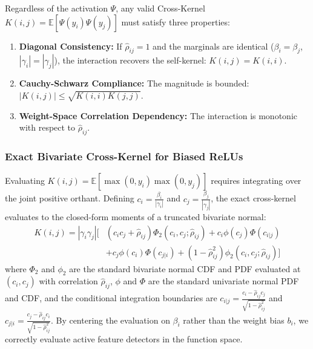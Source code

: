 \documentclass[11pt, a4paper, copyright, gdm]{google}
\newcommand{\abs}[1]{\left\lvert#1\right\rvert}
\newcommand{\E}{\mathbb{E}}
\newcommand{\normPDF}{\phi}
\newcommand{\normCDF}{\Phi}
\theoremstyle{definition}
\begin{document}
Regardless of the activation $\Psi$, any valid Cross-Kernel $K(i, j) = \E[\Psi(y_i)\Psi(y_j)]$ must satisfy three properties:
\begin{enumerate}
\item \textbf{Diagonal Consistency:} If $\hat{\rho}_{ij}=1$ and the marginals are identical ($\beta_i=\beta_j$, $|\gamma_i|=|\gamma_j|$), the interaction recovers the self-kernel: $K(i, j) = K(i, i)$.
\item \textbf{Cauchy-Schwarz Compliance:} The magnitude is bounded: $\abs{K(i, j)} \leq \sqrt{K(i, i) K(j, j)}$.
\item \textbf{Weight-Space Correlation Dependency:} The interaction is monotonic with respect to $\hat{\rho}_{ij}$.
\end{enumerate}

\subsubsection{Exact Bivariate Cross-Kernel for Biased ReLUs}
\label{sec:exact_bivar}
Evaluating $K(i, j) = \E[\max(0, y_i) \max(0, y_j)]$ requires integrating over the joint positive orthant. Defining $c_i = \frac{\beta_i}{|\gamma_i|}$ and $c_j = \frac{\beta_j}{|\gamma_j|}$, the exact cross-kernel evaluates to the closed-form moments of a truncated bivariate normal:
\begin{align}
    K(i, j) = |\gamma_i \gamma_j| \Bigg[ &(c_i c_j + \hat{\rho}_{ij}) \Phi_2(c_i, c_j; \hat{\rho}_{ij}) + c_i \normPDF(c_j) \normCDF(c_{i|j}) \nonumber \\
    &+ c_j \normPDF(c_i) \normCDF(c_{j|i}) + (1-\hat{\rho}_{ij}^2) \phi_2(c_i, c_j; \hat{\rho}_{ij}) \Bigg]
\end{align}
where $\Phi_2$ and $\phi_2$ are the standard bivariate normal CDF and PDF evaluated at $(c_i, c_j)$ with correlation $\hat{\rho}_{ij}$, $\normPDF$ and $\normCDF$ are the standard univariate normal PDF and CDF, and the conditional integration boundaries are $c_{i|j} = \frac{c_i - \hat{\rho}_{ij} c_j}{\sqrt{1-\hat{\rho}_{ij}^2}}$ and $c_{j|i} = \frac{c_j - \hat{\rho}_{ij} c_i}{\sqrt{1-\hat{\rho}_{ij}^2}}$. By centering the evaluation on $\beta_i$ rather than the weight bias $b_i$, we correctly evaluate active feature detectors in the function space.
\end{document}
